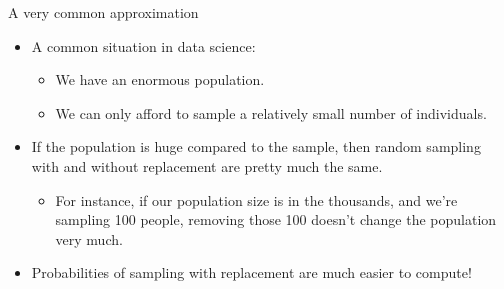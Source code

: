 \documentclass[aspectratio=169]{../latex_main/tntbeamer}  %
\begin{document}
		
	
	\begin{frame}{A very common approximation}
	    \begin{itemize}
	        \item A common situation in data science:
	        \begin{itemize}
	            \item We have an enormous population.
	            \item We can only afford to sample a relatively small number of individuals.
	        \end{itemize}
	        \item If the population is huge compared to the sample, then random sampling with and without replacement are pretty much the same.
	        \begin{itemize}
	            \item For instance, if our population size is in the thousands, and we’re sampling 100 people, removing those 100 doesn’t change the population very much.
	        \end{itemize}
	        \item Probabilities of sampling with replacement are much easier to compute!
	    \end{itemize}
	\end{frame}
	
\end{document}
